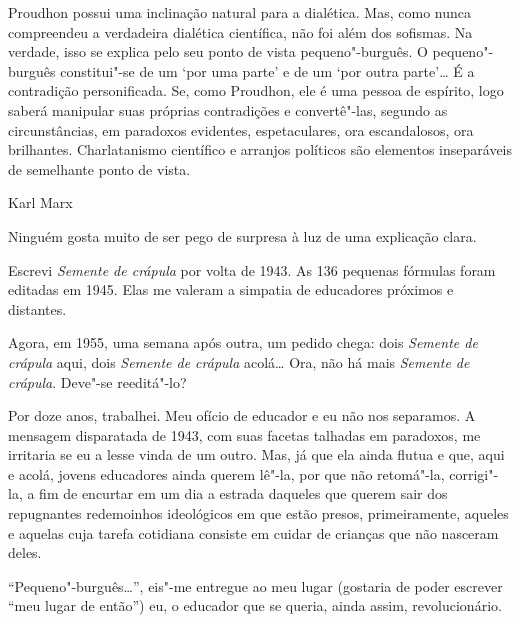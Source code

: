 \movetooddpage
\thispagestyle{empty}
\setcounter{footnote}{0}
\begin{vplace}[0.25]


{\large{}}
\end{vplace}

\pagebreak
\thispagestyle{empty}

\movetooddpage

\epigraph{Proudhon possui uma inclinação natural para a dialética. Mas, como
nunca compreendeu a verdadeira dialética científica, não foi além dos
sofismas. Na verdade, isso se explica pelo seu ponto de vista
pequeno"-burguês. O pequeno"-burguês constitui"-se de um `por uma parte'
e de um `por outra parte'\ldots{} É a contradição personificada. Se, como
Proudhon, ele é uma pessoa de espírito, logo saberá manipular suas
próprias contradições e convertê"-las, segundo as circunstâncias, em
paradoxos evidentes, espetaculares, ora escandalosos, ora brilhantes.
Charlatanismo científico e arranjos políticos são elementos inseparáveis
de semelhante ponto de vista.}{Karl Marx}

Ninguém gosta muito de ser pego de surpresa à luz de uma explicação
clara.

Escrevi \emph{Semente de crápula} por volta de 1943. As 136 pequenas
fórmulas foram editadas em 1945. Elas me valeram a simpatia de
educadores próximos e distantes.

Agora, em 1955, uma semana após outra, um pedido chega: dois
\emph{Semente de crápula} aqui, dois \emph{Semente de crápula}
acolá\ldots{} Ora, não há mais \emph{Semente de crápula}. Deve"-se
reeditá"-lo?

Por doze anos, trabalhei. Meu ofício de educador e eu não nos separamos.
A mensagem disparatada de 1943, com suas facetas talhadas em paradoxos,
me irritaria se eu a lesse vinda de um outro. Mas, já que ela ainda
flutua e que, aqui e acolá, jovens educadores ainda querem lê"-la, por
que não retomá"-la, corrigi"-la, a fim de encurtar em um dia a estrada
daqueles que querem sair dos repugnantes redemoinhos ideológicos em que
estão presos, primeiramente, aqueles e aquelas cuja tarefa cotidiana
consiste em cuidar de crianças que não nasceram deles.

``Pequeno"-burguês\ldots{}'', eis"-me entregue ao meu lugar (gostaria de poder
escrever ``meu lugar de então'') eu, o educador que se queria, ainda
assim, revolucionário.

